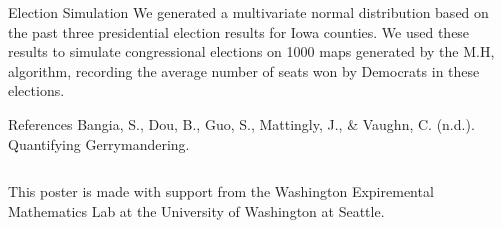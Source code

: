 \documentclass[leqno, handout]{beamer}
\theoremstyle{definition}
\begin{document}
\begin{frame}
\begin{columns}[t]
\begin{column}{.25\linewidth}

\begin{block}{Election Simulation}
We generated a multivariate normal distribution based on the past three presidential election results for Iowa counties. We used these results to simulate congressional elections on 1000 maps generated by the M.H, algorithm, recording the average number of seats won by Democrats in these elections. 
\end{block}

\begin{block}{References}
Bangia, S., Dou, B., Guo, S., Mattingly, J., \& Vaughn, C. (n.d.). Quantifying Gerrymandering.


\end{block}

\end{column}

\end{columns}

\vfill

  \begin{block}{}
   \begin{center}
This poster is made with support from the Washington Expiremental Mathematics Lab at the University of Washington at Seattle.
  \end{center}
  \end{block}



\end{frame}
\end{document}
